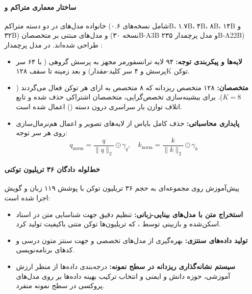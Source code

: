 \item {}

\paragraph*{ساختار معماری متراکم و }
خانواده مدل‌های  \cite{qwen3_2025} در دو دسته متراکم (شامل نسخه‌های ۰.۶B، ۱.۷B، ۴B، ۸B، ۱۴B و ۳۲B) و مدل‌های مبتنی بر متخصصان (نسخه ۳۰B-A3B و مدل پرچمدار ۲۳۵B-A22B) طراحی شده‌اند. در مدل پرچمدار :
\begin{itemize}
    \item \textbf{لایه‌ها و پیکربندی توجه:} ۹۴ لایه ترانسفورمر مجهز به پرسش گروهی ( با ۶۴ سر پرسش و ۴ سر کلید-مقدار) و بعد زمینه تا سقف ۱۲۸K توکن.
    \item \textbf{متخصصان:} ۱۲۸ متخصص ریزدانه که ۸ متخصص به ازای هر توکن فعال می‌گردند ($K=8$). برای بیشینه‌سازی تخصص‌گرایی، متخصصان اشتراکی حذف شده و تابع اتلاف توازن بار سراسری درون دسته () اعمال شده است.
    \item \textbf{پایداری محاسباتی:} حذف کامل بایاس از لایه‌های تصویر  و اعمال هم‌نرمال‌سازی  روی هر سر توجه:
    \begin{equation}
        q_{\text{norm}} = \frac{q}{\|q\|_2} \odot \gamma_q, \quad k_{\text{norm}} = \frac{k}{\|k\|_2} \odot \gamma_k
    \end{equation}
\end{itemize}

\paragraph*{خط‌لوله دادگان ۳۶ تریلیون توکنی}
پیش‌آموزش روی مجموعه‌ای به حجم ۳۶ تریلیون توکن با پوشش ۱۱۹ زبان و گویش اجرا شده است:
\begin{itemize}
    \item \textbf{استخراج متن با مدل‌های بینایی-زبانی:} تنظیم دقیق  جهت شناسایی متن در اسناد اسکن‌شده  و بازبینی توسط ، که تریلیون‌ها توکن متنی باکیفیت تولید کرد.
    \item \textbf{تولید داده‌های سنتزی:} بهره‌گیری از مدل‌های تخصصی  و  جهت سنتز متون درسی و کدهای برنامه‌نویسی.
    \item \textbf{سیستم نشانه‌گذاری ریزدانه در سطح نمونه:} درجه‌بندی داده‌ها از منظر ارزش آموزشی، حوزه دانش و ایمنی و انتخاب ترکیب بهینه داده‌ها بر روی مدل‌های پروکسی در سطح نمونه منفرد.
\end{itemize}

